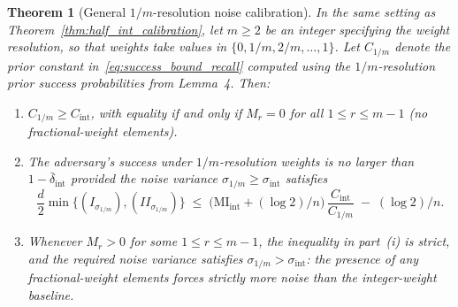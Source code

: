 \documentclass[sigconf,anonymous, review]{acmart}
\newcommand{\MI}{\mathrm{MI}}
\newtheorem{theorem}{Theorem}
\begin{document}
\begin{theorem}[General $1/m$-resolution noise calibration]
\label{thm:general_m_calibration}
In the same setting as Theorem~\ref{thm:half_int_calibration}, let $m \ge 2$ be an integer specifying the weight resolution, so that weights take values in $\{0, 1/m, 2/m, \dots, 1\}$. Let $C_{1/m}$ denote the prior constant in~\eqref{eq:success_bound_recall} computed using the $1/m$-resolution prior success probabilities from Lemma~4. Then:
\begin{enumerate}[label=(\roman*)]
    \item $C_{1/m} \ge C_{\mathrm{int}}$, with equality if and only if $M_r = 0$ for all $1 \le r \le m-1$ (no fractional-weight elements).

    \item The adversary's success under $1/m$-resolution weights is no larger than $1 - \bar{\delta}_{\mathrm{int}}$ provided the noise variance $\sigma_{1/m} \ge \sigma_{\mathrm{int}}$ satisfies
    \begin{equation}
    \label{eq:m_calibration}
    \frac{d}{2}\min\{(I_{\sigma_{1/m}}),(II_{\sigma_{1/m}})\}
    \;\le\;
    \big(\MI_{\mathrm{int}} + (\log 2)/n\big)\,\frac{C_{\mathrm{int}}}{C_{1/m}}
    \;-\; (\log 2)/n.
    \end{equation}

    \item Whenever $M_r > 0$ for some $1 \le r \le m-1$, the inequality in part~(i) is strict, and the required noise variance satisfies $\sigma_{1/m} > \sigma_{\mathrm{int}}$: the presence of any fractional-weight elements forces strictly more noise than the integer-weight baseline.
\end{enumerate}
\end{theorem}
\end{document}
